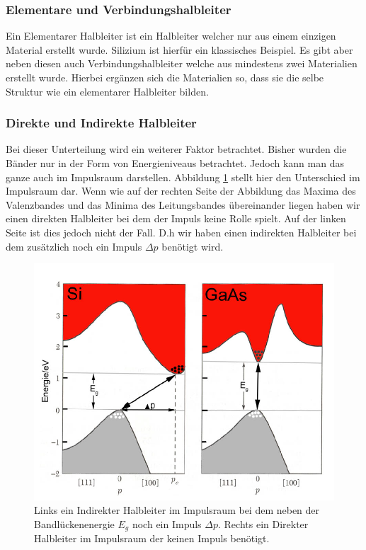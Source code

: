 \subsubsection{Elementare und Verbindungshalbleiter}
Ein Elementarer Halbleiter ist ein Halbleiter welcher nur aus einem einzigen Material erstellt wurde. Silizium ist hierfür ein klassisches Beispiel. Es gibt aber neben diesen auch Verbindungshalbleiter welche aus mindestens zwei Materialien erstellt wurde. Hierbei ergänzen sich die Materialien so, dass sie die selbe Struktur wie ein elementarer Halbleiter bilden.
\subsubsection{Direkte und Indirekte Halbleiter}
Bei dieser Unterteilung wird ein weiterer Faktor betrachtet. Bisher wurden die Bänder nur in der Form von Energieniveaus betrachtet. Jedoch kann man das ganze auch im Impulsraum darstellen. Abbildung \ref{Indirekt} stellt hier den Unterschied im Impulsraum dar. Wenn wie auf der rechten Seite der Abbildung das Maxima des Valenzbandes und das Minima des Leitungsbandes übereinander liegen haben wir einen direkten Halbleiter bei dem der Impuls keine Rolle spielt. Auf der linken Seite ist dies jedoch nicht der Fall. D.h wir haben einen indirekten Halbleiter bei dem zusätzlich noch ein Impuls $\Delta p$ benötigt wird.
\begin{figure}[ht]
	\includegraphics[scale=0.6]{Bild/InDi}
	\centering
	\caption[Indirekt und Direkte Halbleiter]{Links ein Indirekter Halbleiter im Impulsraum bei dem neben der Bandlückenenergie $E_g$ noch ein Impuls $\Delta p$. Rechts ein Direkter Halbleiter im Impulsraum der keinen Impuls benötigt.}
	\label{Indirekt}
\end{figure}
